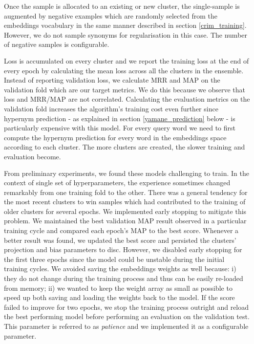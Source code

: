 Once the sample is allocated to an existing or new cluster, the single-sample is augmented by negative examples which are randomly selected from the embeddings vocabulary in the same manner described in section \ref{crim_training}.  However, we do not sample synonyms for regularisation in this case.  The number of negative samples is configurable.

Loss is accumulated on every cluster and we report the training loss at the end of every epoch by calculating the mean loss across all the clusters in the ensemble.  Instead of reporting validation loss, we calculate \ac{MRR} and \ac{MAP} on the validation fold which are our target metrics.  We do this because we observe that loss and \ac{MRR}/\ac{MAP} are not correlated.  Calculating the evaluation metrics on the validation fold increases the algorithm's training cost even further since hypernym prediction - as explained in section \ref{yamane_prediction} below - is particularly expensive with this model.  For every query word we need to first compute the hypernym prediction for every word in the embeddings space according to each cluster.  The more clusters are created, the slower training and evaluation become.

From preliminary experiments, we found these models challenging to train.  In the context of single set of hyperparameters, the experience sometimes changed remarkably from one training fold to the other.  There was a general tendency for the most recent clusters to win samples which had contributed to the training of older clusters for several epochs.  We implemented early stopping to mitigate this problem.  We maintained the best validation MAP result observed in a particular training cycle and compared each epoch's MAP to the best score.  Whenever a better result was found, we updated the best score and persisted the clusters' projection and bias parameters to disc.  However, we disabled early stopping for the first three epochs since the model could be unstable during the initial training cycles.  We avoided saving the embeddings weights as well because: i) they do not change during the training process and thus can be easily re-loaded from memory; ii) we wanted to keep the weight array as small as possible to speed up both saving and loading the weights back to the model. If the score failed to improve for two epochs, we stop the training process outright and reload the best performing model before performing an evaluation on the validation test.  This parameter is referred to as \textit{patience} and we implemented it as a configurable parameter.

